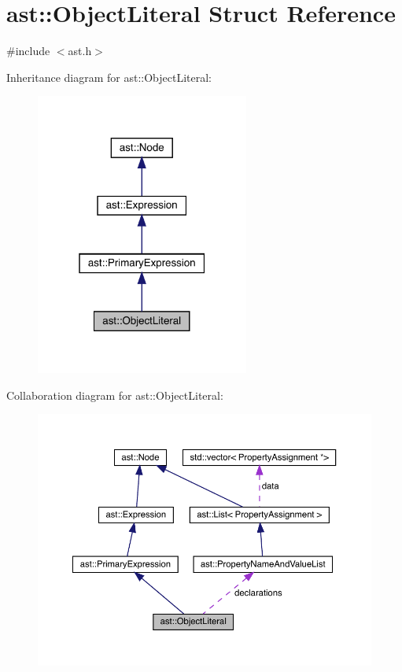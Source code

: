 \hypertarget{structast_1_1_object_literal}{}\section{ast\+:\+:Object\+Literal Struct Reference}
\label{structast_1_1_object_literal}


{\ttfamily \#include $<$ast.\+h$>$}



Inheritance diagram for ast\+:\+:Object\+Literal\+:
\nopagebreak
\begin{figure}[H]
\begin{center}
\leavevmode
\includegraphics[width=199pt]{structast_1_1_object_literal__inherit__graph}
\end{center}
\end{figure}


Collaboration diagram for ast\+:\+:Object\+Literal\+:
\nopagebreak
\begin{figure}[H]
\begin{center}
\leavevmode
\includegraphics[width=350pt]{structast_1_1_object_literal__coll__graph}
\end{center}
\end{figure}
